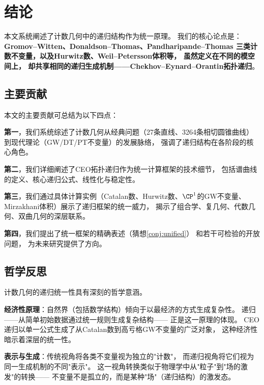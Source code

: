 
\section{结论}\label{sec:conclusion}

本文系统阐述了计数几何中的递归结构作为统一原理。
我们的核心论点是：
\textbf{Gromov--Witten、Donaldson--Thomas、Pandharipande--Thomas
三类计数不变量，以及Hurwitz数、Weil--Petersson体积等，
虽然定义在不同的模空间上，
却共享相同的递归生成机制——Chekhov--Eynard--Orantin拓扑递归}。

\subsection{主要贡献}

本文的主要贡献可总结为以下四点：

\textbf{第一}，我们系统综述了计数几何从经典问题（27条直线、3264条相切圆锥曲线）
到现代理论（GW/DT/PT不变量）的发展脉络，
强调了递归结构在各阶段的核心角色。

\textbf{第二}，我们详细阐述了CEO拓扑递归作为统一计算框架的技术细节，
包括谱曲线的定义、核心递归公式、线性化与稳定性。

\textbf{第三}，我们通过具体计算实例（Catalan数、Hurwitz数、$\CP^1$的GW不变量、
Mirzakhani体积）展示了递归框架的统一威力，
揭示了组合学、复几何、代数几何、双曲几何的深层联系。

\textbf{第四}，我们提出了统一框架的精确表述（猜想\ref{conj:unified}）
和若干可检验的开放问题，
为未来研究提供了方向。

\subsection{哲学反思}

计数几何的递归统一性具有深刻的哲学意涵。

\textbf{经济性原理}：自然界（包括数学结构）倾向于以最经济的方式生成复杂性。
递归——从简单初始数据通过统一规则生成复杂结构——
正是这一原理的体现。
CEO递归以单一公式生成了从Catalan数到高亏格GW不变量的广泛对象，
这种经济性暗示着深层的统一性。

\textbf{表示与生成}：传统视角将各类不变量视为独立的"计数"，
而递归视角将它们视为同一生成机制的不同"表示"。
这一视角转换类似于物理学中从"粒子"到"场的激发"的转换——
不变量不是孤立的，而是某种"场"（递归结构）的激发态。

